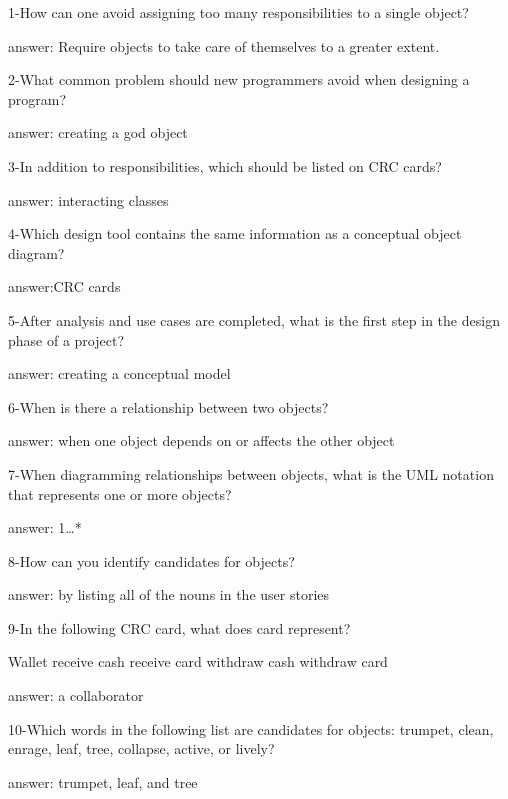 1-How can one avoid assigning too many responsibilities to a single object?


answer: Require objects to take care of themselves to a greater extent.

2-What common problem should new programmers avoid when designing a program?


answer: creating a god object

3-In addition to responsibilities, which should be listed on CRC cards?


answer: interacting classes

4-Which design tool contains the same information as a conceptual object diagram?


answer:CRC cards

5-After analysis and use cases are completed, what is the first step in the design phase of a project?


answer: creating a conceptual model

6-When is there a relationship between two objects?


answer: when one object depends on or affects the other object

7-When diagramming relationships between objects, what is the UML notation that represents one or more objects?


answer: 1…*

8-How can you identify candidates for objects?


answer: by listing all of the nouns in the user stories

9-In the following CRC card, what does card represent?

Wallet
receive                        cash
receive                        card
withdraw                     cash
withdraw                     card

answer: a collaborator

10-Which words in the following list are candidates for objects: trumpet, clean, enrage, leaf, tree, collapse, active, or lively?


answer: trumpet, leaf, and tree
